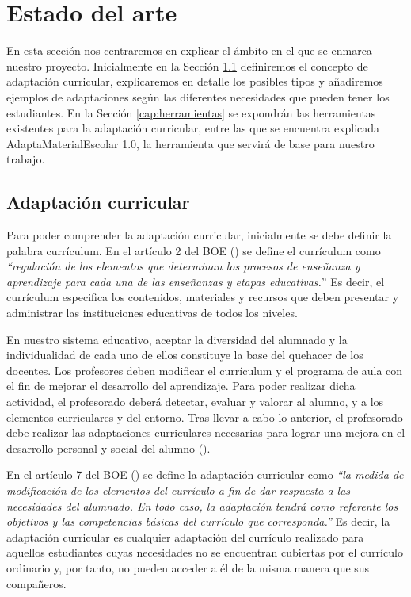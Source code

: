 \chapter{Estado del arte}
\label{cap:estadoDelArte}
En esta sección nos centraremos en explicar el ámbito en el que se enmarca nuestro proyecto. Inicialmente en la Sección \ref{cap:adaptacion} definiremos el concepto de adaptación curricular, explicaremos en detalle los posibles tipos y añadiremos ejemplos de adaptaciones según las diferentes necesidades que pueden tener los estudiantes. En la Sección \ref{cap:herramientas}  se expondrán las herramientas existentes para la adaptación curricular, entre las que se encuentra explicada AdaptaMaterialEscolar 1.0, la herramienta que servirá de base para nuestro trabajo.

\section{Adaptación curricular}\label{cap:adaptacion}
Para poder comprender la adaptación curricular, inicialmente se debe definir la palabra currículum. En el artículo 2 del BOE (\citeyear[p.5]{BOE2}) se define el currículum como \textit{``regulación de los elementos que determinan los procesos de enseñanza y aprendizaje para cada una de las enseñanzas y etapas educativas.}'' Es decir, el currículum especifica los contenidos, materiales y recursos que deben presentar y administrar las instituciones educativas de todos los niveles.
\newline

En nuestro sistema educativo, aceptar la diversidad del alumnado y la individualidad de cada uno de ellos constituye la base del quehacer de los docentes. Los profesores deben modificar el currículum y el programa de aula con el fin de mejorar el desarrollo del aprendizaje. Para poder realizar dicha actividad, el profesorado deberá detectar, evaluar y valorar al alumno, y a los elementos curriculares y del entorno. Tras llevar a cabo lo anterior, el profesorado debe realizar las adaptaciones curriculares necesarias para lograr una mejora en el desarrollo personal y social del alumno (\cite{adaptacionIntro}).
\newline

En el artículo 7 del BOE (\citeyear[p.7]{BOE}) se define la adaptación curricular como \textit{``la medida de modificación de los elementos del currículo a fin de dar respuesta a las necesidades del alumnado. En todo caso, la adaptación tendrá como referente los objetivos y las competencias básicas del currículo que corresponda.''} Es decir, la adaptación curricular es cualquier adaptación del currículo realizado para aquellos estudiantes cuyas necesidades no se encuentran cubiertas por el currículo ordinario y, por tanto, no pueden acceder a él de la misma manera que sus compañeros.
\newline


